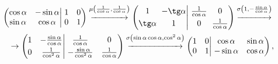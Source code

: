     \begin{multline*}
        \hspace{-1pc}\left(\begin{matrix}
            \cos \alpha & -\sin \alpha \\ 
            \sin \alpha & \cos \alpha
        \end{matrix}\right|\left.\begin{matrix}
            1 & 0 \\
            0 & 1
        \end{matrix}\right)
         \overset{\mu\left( \frac{1}{\cos \alpha}, \frac{1}{\cos \alpha} \right)}{\xrightarrow{\hspace*{3.3pc}}}
        \setlength\arraycolsep{3pt}
        \left(\begin{matrix}
            1 & -\tg\alpha \\[3pt] 
            \tg \alpha & 1
        \end{matrix}\right|\left.\begin{matrix}
            \frac{1}{\cos \alpha} & 0 \\[3pt]
            0 & \frac{1}{\cos \alpha}
        \end{matrix}\right)
        \overset{\sigma\left(1, -\frac{\sin \alpha}{\cos \alpha}\right)}{\xrightarrow{\hspace*{3pc}}} \\
        \rightarrow
        \left(\begin{matrix}
            1 & -\frac{\sin \alpha}{\cos \alpha} \\[3pt]
            0 & \frac{1}{\cos^2 \alpha}
        \end{matrix}\right|\left.\begin{matrix}
            \frac{1}{\cos \alpha} & 0 \\[3pt]
            -\frac{\sin \alpha}{\cos^2 \alpha} & \frac{1}{\cos \alpha}
        \end{matrix}\right) 
        \overset{\sigma\left(\sin \alpha \cos \alpha, \cos^2 \alpha \right)}{\xrightarrow{\hspace*{5.1pc}}} 
        \left(\begin{matrix}
            1 & 0 \\ 
            0 & 1
        \end{matrix}\right|\left.\begin{matrix}
            \cos \alpha & \sin \alpha \\
            -\sin \alpha & \cos \alpha
        \end{matrix}\right),
    \end{multline*}
